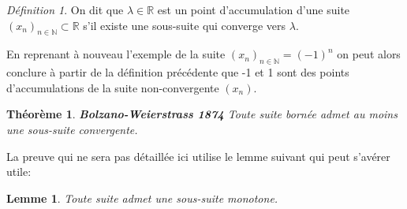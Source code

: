 \documentclass[oneside,12pt,french,table]{book}
\newtheorem{lemma}{Lemme}[chapter]
\theoremstyle{definition}
\theoremstyle{plain}
\newtheorem{theorem}[definition]{Théorème}
\theoremstyle{remark}
\newtheorem{defi}[definition]{Définition}
\newcommand{\Nn}{{\mathbb{N}}}
\newcommand{\Rr}{{\mathbb{R}}}
\begin{document}
\begin{defi}\label{def422}
On dit que $\lambda \in \Rr $ est un point d'accumulation d'une suite $(x_n)_{n \in \Nn} \subset \Rr$ s'il existe une sous-suite qui converge vers $\lambda$.
\end{defi}
En reprenant à nouveau l'exemple de la suite $(x_n)_{n \in \Nn} = (-1)^n$ on peut alors conclure à partir de la définition précédente que -1 et 1 sont des points d'accumulations de la suite non-convergente $(x_n)$.  
 
\begin{theorem}{\textbf{Bolzano-Weierstrass 1874}}
    Toute suite bornée admet au moins une sous-suite convergente. 
\end{theorem}
La preuve qui ne sera pas détaillée ici utilise le lemme suivant qui peut s'avérer utile:

\begin{lemma}
\label{peak point lemma}
    Toute suite admet une sous-suite monotone.
\end{lemma}



    
\end{document}
